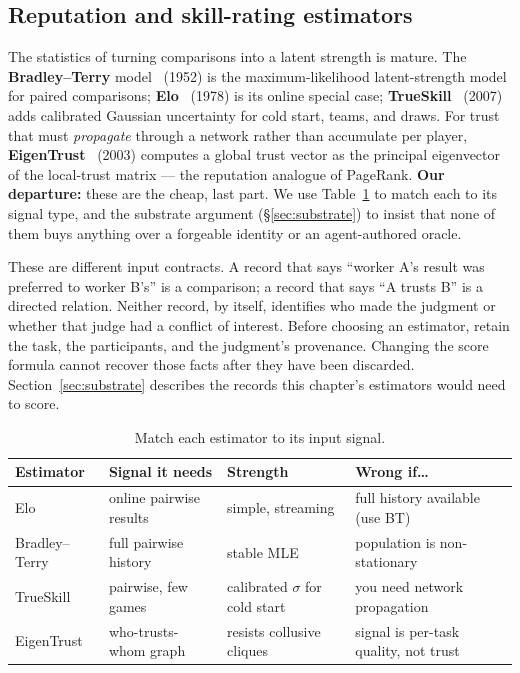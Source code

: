 \documentclass[11pt,a4paper]{article}
\theoremstyle{definition}
\begin{document}
\subsection{Reputation and skill-rating estimators}

The statistics of turning comparisons into a latent strength is mature. The
\textbf{Bradley--Terry} model~ (1952) is the
maximum-likelihood latent-strength model for paired comparisons; \textbf{Elo}~
(1978) is its online special case; \textbf{TrueSkill}~
(2007) adds calibrated Gaussian uncertainty for cold start, teams, and draws. For
trust that must \emph{propagate} through a network rather than accumulate per
player, \textbf{EigenTrust}~ (2003) computes a global
trust vector as the principal eigenvector of the local-trust matrix --- the
reputation analogue of PageRank. \textbf{Our departure:} these are the cheap, last
part. We use Table~\ref{tab:estimators} to match each to its signal type, and the
substrate argument (\S\ref{sec:substrate}) to insist that none of them buys
anything over a forgeable identity or an agent-authored oracle.

These are different input contracts. A record that says ``worker A's result
was preferred to worker B's'' is a comparison; a record that says ``A trusts
B'' is a directed relation. Neither record, by itself, identifies who made
the judgment or whether that judge had a conflict of interest. Before choosing
an estimator, retain the task, the participants, and the judgment's provenance.
Changing the score formula cannot recover those facts after they have been
discarded. Section~\ref{sec:substrate} describes the records this chapter's
estimators would need to score.

\begin{table}[H]
\centering\small\renewcommand{\arraystretch}{1.3}
\begin{tabularx}{\textwidth}{@{}l >{\raggedright\arraybackslash}X >{\raggedright\arraybackslash}X >{\raggedright\arraybackslash}X@{}}
\toprule
\textbf{Estimator} & \textbf{Signal it needs} & \textbf{Strength} & \textbf{Wrong if\ldots} \\
\midrule
Elo & online pairwise results & simple, streaming & full history available (use BT) \\
Bradley--Terry & full pairwise history & stable MLE & population is non-stationary \\
TrueSkill & pairwise, few games & calibrated $\sigma$ for cold start & you need network propagation \\
EigenTrust & who-trusts-whom graph & resists collusive cliques & signal is per-task quality, not trust \\
\bottomrule
\end{tabularx}
\caption{Match each estimator to its input signal.}
\label{tab:estimators}
\end{table}
\end{document}
